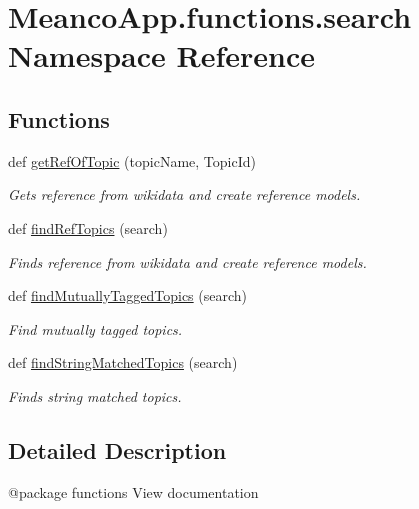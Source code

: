 \hypertarget{namespace_meanco_app_1_1functions_1_1search}{}\section{Meanco\+App.\+functions.\+search Namespace Reference}
\label{namespace_meanco_app_1_1functions_1_1search}
\subsection*{Functions}
\begin{DoxyCompactItemize}
\item 
def \hyperlink{namespace_meanco_app_1_1functions_1_1search_a765863e89806bb8fd938f85d8f6db67a}{get\+Ref\+Of\+Topic} (topic\+Name, Topic\+Id)
\begin{DoxyCompactList}\small\item\em Gets reference from wikidata and create reference models. \end{DoxyCompactList}\item 
def \hyperlink{namespace_meanco_app_1_1functions_1_1search_ad033c051ea9ae6c4a1256ada1392ad18}{find\+Ref\+Topics} (search)
\begin{DoxyCompactList}\small\item\em Finds reference from wikidata and create reference models. \end{DoxyCompactList}\item 
def \hyperlink{namespace_meanco_app_1_1functions_1_1search_a586e968398f8f8a93016191459cacd60}{find\+Mutually\+Tagged\+Topics} (search)
\begin{DoxyCompactList}\small\item\em Find mutually tagged topics. \end{DoxyCompactList}\item 
def \hyperlink{namespace_meanco_app_1_1functions_1_1search_abe184d83dc97bdf6971f35c813cd2384}{find\+String\+Matched\+Topics} (search)
\begin{DoxyCompactList}\small\item\em Finds string matched topics. \end{DoxyCompactList}\end{DoxyCompactItemize}


\subsection{Detailed Description}
\begin{DoxyVerb}@package functions
View documentation\end{DoxyVerb}
 

